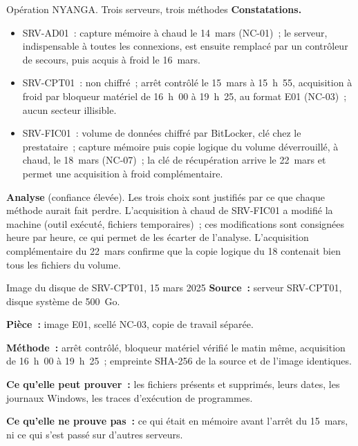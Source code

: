 \begin{boxscenario}{Opération NYANGA. Trois serveurs, trois méthodes}
\textbf{Constatations.}
\begin{itemize}
    \item SRV-AD01~: capture mémoire à chaud le 14~mars (NC-01)~; le serveur,
          indispensable à toutes les connexions, est ensuite remplacé par un
          contrôleur de secours, puis acquis à froid le 16~mars.
    \item SRV-CPT01~: non chiffré~; arrêt contrôlé le 15~mars à 15~h~55,
          acquisition à froid par bloqueur matériel de 16~h~00 à 19~h~25, au
          format E01 (NC-03)~; aucun secteur illisible.
    \item SRV-FIC01~: volume de données chiffré par BitLocker, clé chez le
          prestataire~; capture mémoire puis copie logique du volume
          déverrouillé, à chaud, le 18~mars (NC-07)~; la clé de récupération
          arrive le 22~mars et permet une acquisition à froid complémentaire.
\end{itemize}

\textbf{Analyse} (confiance élevée). Les trois choix sont justifiés par ce
que chaque méthode aurait fait perdre. L'acquisition à chaud de SRV-FIC01 a
modifié la machine (outil exécuté, fichiers temporaires)~; ces
modifications sont consignées heure par heure, ce qui permet de les écarter
de l'analyse. L'acquisition complémentaire du 22~mars confirme que la copie
logique du 18 contenait bien tous les fichiers du volume.
\end{boxscenario}

\begin{boxobjet}{Image du disque de SRV-CPT01, 15 mars 2025}
\textbf{Source~:} serveur SRV-CPT01, disque système de 500~Go.

\textbf{Pièce~:} image E01, scellé NC-03, copie de travail séparée.

\textbf{Méthode~:} arrêt contrôlé, bloqueur matériel vérifié le matin même,
acquisition de 16~h~00 à 19~h~25~; empreinte SHA-256 de la source et de
l'image identiques.

\textbf{Ce qu'elle peut prouver~:} les fichiers présents et supprimés, leurs
dates, les journaux Windows, les traces d'exécution de programmes.

\textbf{Ce qu'elle ne prouve pas~:} ce qui était en mémoire avant l'arrêt du
15~mars, ni ce qui s'est passé sur d'autres serveurs.
\end{boxobjet}

